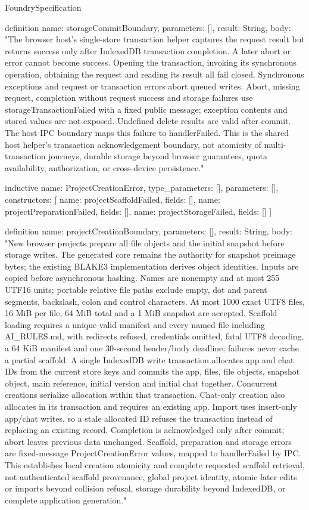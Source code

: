 \begin{lexlean}{FoundrySpecification}
\begin{semanticmodule}
definition{
  name: storageCommitBoundary,
  parameters: [],
  result: String,
  body: "The browser host's single-store transaction helper captures the request result but returns success only after IndexedDB transaction completion. A later abort or error cannot become success. Opening the transaction, invoking its synchronous operation, obtaining the request and reading its result all fail closed. Synchronous exceptions and request or transaction errors abort queued writes. Abort, missing request, completion without request success and storage failures use storageTransactionFailed with a fixed public message; exception contents and stored values are not exposed. Undefined delete results are valid after commit. The host IPC boundary maps this failure to handlerFailed. This is the shared host helper's transaction acknowledgement boundary, not atomicity of multi-transaction journeys, durable storage beyond browser guarantees, quota availability, authorization, or cross-device persistence."
}

inductive{
  name: ProjectCreationError,
  type_parameters: [],
  parameters: [],
  constructors: [
    {name: projectScaffoldFailed, fields: []},
    {name: projectPreparationFailed, fields: []},
    {name: projectStorageFailed, fields: []}
  ]
}

definition{
  name: projectCreationBoundary,
  parameters: [],
  result: String,
  body: "New browser projects prepare all file objects and the initial snapshot before storage writes. The generated core remains the authority for snapshot preimage bytes; the existing BLAKE3 implementation derives object identities. Inputs are copied before asynchronous hashing. Names are nonempty and at most 255 UTF16 units; portable relative file paths exclude empty, dot and parent segments, backslash, colon and control characters. At most 1000 exact UTF8 files, 16 MiB per file, 64 MiB total and a 1 MiB snapshot are accepted. Scaffold loading requires a unique valid manifest and every named file including AI_RULES.md, with redirects refused, credentials omitted, fatal UTF8 decoding, a 64 KiB manifest and one 30-second header/body deadline; failures never cache a partial scaffold. A single IndexedDB write transaction allocates app and chat IDs from the current store keys and commits the app, files, file objects, snapshot object, main reference, initial version and initial chat together. Concurrent creations serialize allocation within that transaction. Chat-only creation also allocates in its transaction and requires an existing app. Import uses insert-only app/chat writes, so a stale allocated ID refuses the transaction instead of replacing an existing record. Completion is acknowledged only after commit; abort leaves previous data unchanged. Scaffold, preparation and storage errors are fixed-message ProjectCreationError values, mapped to handlerFailed by IPC. This establishes local creation atomicity and complete requested scaffold retrieval, not authenticated scaffold provenance, global project identity, atomic later edits or imports beyond collision refusal, storage durability beyond IndexedDB, or complete application generation."
}


\end{semanticmodule}
\end{lexlean}
